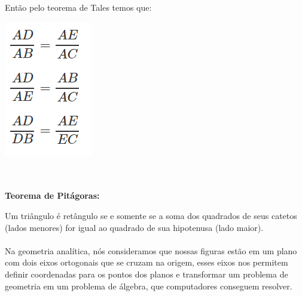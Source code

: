 \documentclass[a4paper,12pt]{article}
\begin{document}
Então pelo teorema de Tales temos que:

\begin{center}
  \includegraphics[width=\linewidth/5]{figures/matematica_computacional/geometria_basica/teorema_tales_2.png}
\end{center}

\\~\\\noindent\textbf{Teorema de Pitágoras:}

\noindent Um triângulo é retângulo se e somente se a soma dos quadrados de seus catetos (lados menores) for igual ao quadrado de sua hipotenusa (lado maior).
\\~\\
\noindent Na geometria analítica, nós consideramos que nossas figuras estão em um plano com dois eixos ortogonais que se cruzam na origem, esses eixos nos permitem definir coordenadas para os pontos dos planos e transformar um problema de geometria em um problema de álgebra, que computadores conseguem resolver.
\end{document}
